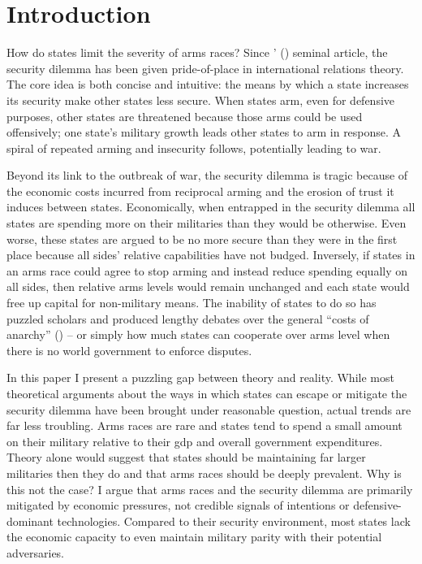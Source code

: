 \documentclass[12pt]{article}
\begin{document}
\newpage
\doublespacing
\section{Introduction}

How do states limit the severity of arms races? Since \citeauthor{jervis1978}' (\citeyear{jervis1978}) seminal article, the security dilemma has been given pride-of-place in international relations theory. The core idea is both concise and intuitive: the means by which a state increases its security make other states less secure. When states arm, even for defensive purposes, other states are threatened because those arms could be used offensively; one state's military growth leads other states to arm in response. A spiral of repeated arming and insecurity follows, potentially leading to war. 

Beyond its link to the outbreak of war, the security dilemma is tragic because of the economic costs incurred from reciprocal arming \citep{fearon2018} and the erosion of trust it induces between states. \citep{kydd2007trust} Economically, when entrapped in the security dilemma all states are spending more on their militaries than they would be otherwise. Even worse, these states are argued to be no more secure than they were in the first place because all sides' relative capabilities have not budged. Inversely, if states in an arms race could agree to stop arming and instead reduce spending equally on all sides, then relative arms levels would remain unchanged and each state would free up capital for non-military means. The inability of states to do so has puzzled scholars and produced lengthy debates over the general ``costs of anarchy” \citeauthor{fearon2018} (\citeyear{fearon2018}) – or simply how much states can cooperate over arms level when there is no world government to enforce disputes.

In this paper I present a puzzling gap between theory and reality. While most theoretical arguments about the ways in which states can escape or mitigate the security dilemma have been brought under reasonable question, actual trends are far less troubling. Arms races are rare and states tend to spend a small amount on their military relative to their gdp and overall government expenditures. Theory alone would suggest that states should be maintaining far larger militaries then they do and that arms races should be deeply prevalent. Why is this not the case? I argue that arms races and the security dilemma are primarily mitigated by economic pressures, not credible signals of intentions \citep{schultz2001looking,snyder2011cost} or defensive-dominant technologies. \citep{van1998offense} Compared to their security environment, most states lack the economic capacity to even maintain military parity with their potential adversaries.
\end{document}
